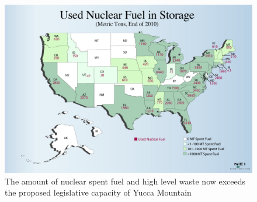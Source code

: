 \begin{figure}[htbp!]
  \begin{center}
    \includegraphics[height=0.7\textheight]{metric_tons.eps}
  \end{center}
  \caption{The amount of nuclear spent fuel and high level waste now exceeds the 
    proposed legislative capacity of Yucca Mountain \cite{peters_whats_2013}}
  \label{fig:metric_tons}
\end{figure}
